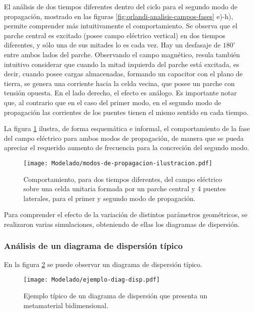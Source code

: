 El análisis de dos tiempos diferentes dentro del ciclo para el segundo modo de propagación, mostrado en las figuras \ref{fig:orlandi-analisis-campos-fases} e)-h), permite comprender más intuitivamente el comportamiento. Se observa que el parche central es excitado (posee campo eléctrico vertical) en dos tiempos diferentes, y sólo una de sus mitades lo es cada vez. Hay un desfasaje de $180^\circ$ entre ambos lados del parche. Observando el campo magnético, resula también intuitivo considerar que cuando la mitad izquierda del parche está excitada, es decir, cuando posee cargas almacenadas, formando un capacitor con el plano de tierra, se genera una corriente hacia la celda vecina, que posee un parche con tensión opuesta. En el lado derecho, el efecto es análogo. Es importante notar que, al contrario que en el caso del primer modo, en el segundo modo de propagación las corrientes de los puentes tienen el mismo sentido en cada tiempo.

La figura \ref{fig:dibujito-modos} ilustra, de forma esquemática e informal, el comportamiento de la fase del campo eléctrico para ambos modos de propagación, de manera que se pueda apreciar el requerido aumento de frecuencia para la concreción del segundo modo.

\begin{figure}[h]
	\centering
	\texttt{[image: Modelado/modos-de-propagacion-ilustracion.pdf]}
	\caption{Comportamiento, para dos tiempos diferentes, del campo eléctrico sobre una celda unitaria formada por un parche central y 4 puentes laterales, para el primer y segundo modo de propagación.}
	\label{fig:dibujito-modos}
\end{figure}


Para comprender el efecto de la variación de distintos parámetros geométricos, se realizaron varias simulaciones, obteniendo de ellas los diagramas de dispersión.

\subsubsection{Análisis de un diagrama de dispersión típico}

En la figura \ref{fig:diag-dispersion-tipico} se puede observar un diagrama de dispersión típico.

\begin{figure}[h]
	\centering
	\texttt{[image: Modelado/ejemplo-diag-disp.pdf]}
	\caption{Ejemplo típico de un diagrama de dispersión que presenta un metamaterial bidimensional.}
	\label{fig:diag-dispersion-tipico}
\end{figure}

